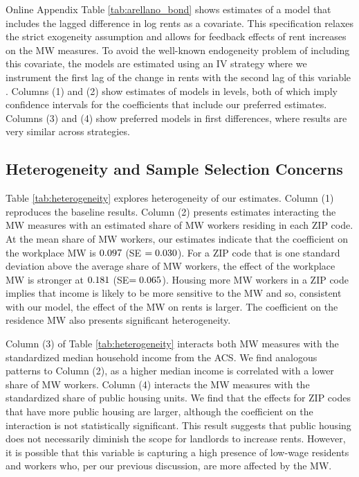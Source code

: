 Online Appendix Table \ref{tab:arellano_bond} shows estimates of a model that 
includes the lagged difference in log rents as a covariate.
This specification relaxes the strict exogeneity assumption and allows for 
feedback effects of rent increases on the MW measures.
To avoid the well-known endogeneity problem of including this covariate, the 
models are estimated using an IV strategy where we instrument the first lag of 
the change in rents with the second lag of this variable 
\parencite{ArellanoBond1991, ArellanoHonore2001}.
Columns (1) and (2) show estimates of models in levels, both of which imply
confidence intervals for the coefficients that include our preferred estimates.
Columns (3) and (4) show preferred models in first differences, where results
are very similar across strategies. 

\subsection{Heterogeneity and Sample Selection Concerns}
\label{sec:results_heterogeneity}

Table \ref{tab:heterogeneity} explores heterogeneity of our estimates.
Column (1) reproduces the baseline results.
Column (2) presents estimates interacting the MW measures with an estimated 
share of MW workers residing in each ZIP code.
At the mean share of MW workers, our estimates indicate that the coefficient
on the workplace MW is $0.097$ (SE $=0.030$).
For a ZIP code that is one standard deviation above the average share of MW 
workers, the effect of the workplace MW is stronger at
$0.181$ (SE$=0.065$).
Housing more MW workers in a ZIP code implies that income is likely to be more 
sensitive to the MW and so, consistent with our model, the effect of the MW
on rents is larger.
The coefficient on the residence MW also presents significant heterogeneity.

Column (3) of Table \ref{tab:heterogeneity} interacts both MW measures with the
standardized median household income from the ACS.
We find analogous patterns to Column (2), as a higher median income is 
correlated with a lower share of MW workers.
Column (4) interacts the MW measures with the standardized share of public 
housing units.
We find that the effects for ZIP codes that have more public housing are larger,
although the coefficient on the interaction is not statistically significant. 
This result suggests that public housing does not necessarily diminish the scope 
for landlords to increase rents.
However, it is possible that this variable is capturing a high presence of 
low-wage residents and workers who, per our previous discussion, are more 
affected by the MW.

